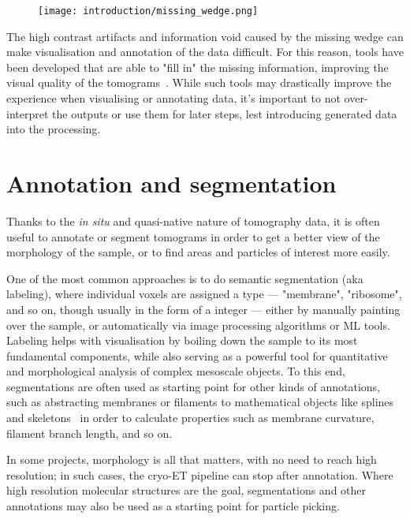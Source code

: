 \begin{figure}[!ht]
    \centering
    \texttt{[image: introduction/missing\_wedge.png]}
    \label{fig:et_missing_wedge}
\end{figure}


The high contrast artifacts and information void caused by the missing wedge can make visualisation and annotation of the data difficult.
For this reason, tools have been developed that are able to "fill in" the missing information, improving the visual quality of the tomograms~\cite{liuIsotropicReconstructionElectron2021,zhangMethodRestoringSignals2023}.
While such tools may drastically improve the experience when visualising or annotating data, it's important to not over-interpret the outputs or use them for later steps, lest introducing generated data into the processing.

\section{Annotation and segmentation}\label{et_annotation_segmentation}
Thanks to the \textit{in situ} and quasi-native nature of tomography data, it is often useful to annotate or segment tomograms in order to get a better view of the morphology of the sample, or to find areas and particles of interest more easily.

One of the most common approaches is to do semantic segmentation (aka labeling), where individual voxels are assigned a type --- "membrane", "ribosome", and so on, though usually in the form of a integer --- either by manually painting over the sample, or automatically via image processing algorithms or ML tools.
Labeling helps with visualisation by boiling down the sample to its most fundamental components, while also serving as a powerful tool for quantitative and morphological analysis of complex mesoscale objects.
To this end, segmentations are often used as starting point for other kinds of annotations, such as abstracting membranes or filaments to mathematical objects like splines and skeletons~\cite{nunez-iglesiasNewPythonLibrary2018} in order to calculate properties such as membrane curvature, filament branch length, and so on.

In some projects, morphology is all that matters, with no need to reach high resolution; in such cases, the cryo-ET pipeline can stop after annotation.
Where high resolution molecular structures are the goal, segmentations and other annotations may also be used as a starting point for particle picking.

